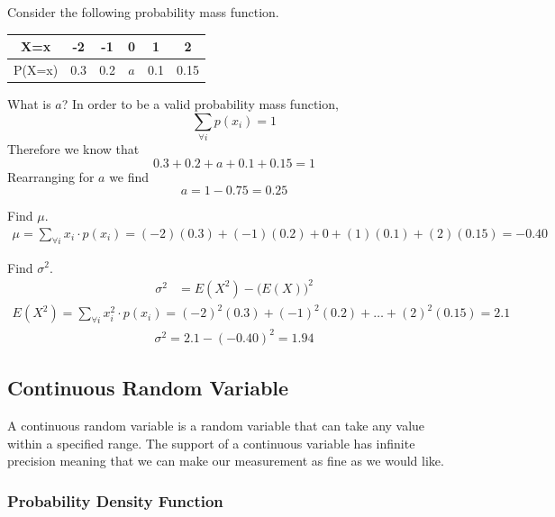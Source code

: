 \begin{example}
Consider the following probability mass function.

\begin{center}
\begin{tabular}{c|c|c|c|c|c}

X=x & -2 & -1 & 0 & 1 & 2 \\ 
\hline 
P(X=x) & 0.3 & 0.2 & $a$ & 0.1 & 0.15 
 
\end{tabular} 
\end{center}

\begin{benumerate}
\item What is $a$?
In order to be a valid probability mass function,
\[ \sum_{\forall i} p(x_i) = 1 \]
Therefore we know that
\[ 0.3 + 0.2 + a+ 0.1 + 0.15 = 1 \]
Rearranging for $a$ we find
\[ a = 1-0.75 = 0.25 \]

\item Find $\mu$.
\begin{align*}
\mu = \sum_{\forall i} x_i \cdot p(x_i)  = (-2)(0.3) + (-1)(0.2) + 0 + (1)(0.1)+(2)(0.15) = -0.40
\end{align*}
\item Find $\sigma^{2}$.
\begin{align*}
\sigma^{2} &= E(X^2) - \Big( E(X) \Big)^2
\end{align*}
\begin{align*}
E(X^2) = \sum_{\forall i} x_i^2 \cdot p(x_i) = (-2)^2 (0.3) + (-1)^2(0.2) + \hdots + (2)^2(0.15) = 2.1
\end{align*}
\begin{align*}
\sigma^{2} = 2.1 - (-0.40)^2 = 1.94
\end{align*}
\end{benumerate}
\end{example}

\subsection{Continuous Random Variable}

A continuous random variable is a random variable that can take any value within
a specified range. 
The support of a continuous variable has infinite precision
meaning that we can make our measurement as
fine as we would like. 

\subsubsection{Probability Density Function}

